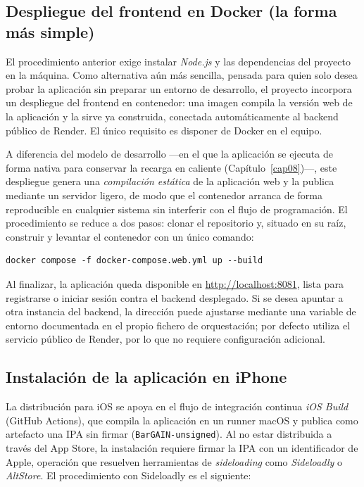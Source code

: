 \subsection{Despliegue del frontend en Docker (la forma m\'as simple)}\label{subsec:manual-docker-web}

El procedimiento anterior exige instalar \emph{Node.js} y las dependencias del proyecto en la
m\'aquina. Como alternativa a\'un m\'as sencilla, pensada para quien solo desea probar la
aplicaci\'on sin preparar un entorno de desarrollo, el proyecto incorpora un despliegue del
frontend en contenedor: una imagen compila la versi\'on web de la aplicaci\'on y la sirve ya
construida, conectada autom\'aticamente al backend p\'ublico de Render. El \'unico requisito es
disponer de Docker en el equipo.

A diferencia del modelo de desarrollo ---en el que la aplicaci\'on se ejecuta de forma nativa para
conservar la recarga en caliente (Cap\'itulo~\ref{cap08})---, este despliegue genera una
\emph{compilaci\'on est\'atica} de la aplicaci\'on web y la publica mediante un servidor ligero, de
modo que el contenedor arranca de forma reproducible en cualquier sistema sin interferir con el
flujo de programaci\'on. El procedimiento se reduce a dos pasos: clonar el repositorio y, situado
en su ra\'iz, construir y levantar el contenedor con un \'unico comando:

{\footnotesize
\begin{verbatim}
docker compose -f docker-compose.web.yml up --build
\end{verbatim}
}

Al finalizar, la aplicaci\'on queda disponible en \url{http://localhost:8081}, lista para
registrarse o iniciar sesi\'on contra el backend desplegado. Si se desea apuntar a otra instancia
del backend, la direcci\'on puede ajustarse mediante una variable de entorno documentada en el
propio fichero de orquestaci\'on; por defecto utiliza el servicio p\'ublico de Render, por lo que
no requiere configuraci\'on adicional.

\subsection{Instalaci\'on de la aplicaci\'on en iPhone}\label{subsec:manual-ios}

La distribuci\'on para iOS se apoya en el flujo de integraci\'on continua \emph{iOS Build}
(GitHub Actions), que compila la aplicaci\'on en un runner macOS y publica como artefacto una
IPA sin firmar (\texttt{BarGAIN-unsigned}). Al no estar distribuida a trav\'es del App Store,
la instalaci\'on requiere firmar la IPA con un identificador de Apple, operaci\'on que resuelven
herramientas de \emph{sideloading} como \emph{Sideloadly} o \emph{AltStore}. El procedimiento
con Sideloadly es el siguiente:

